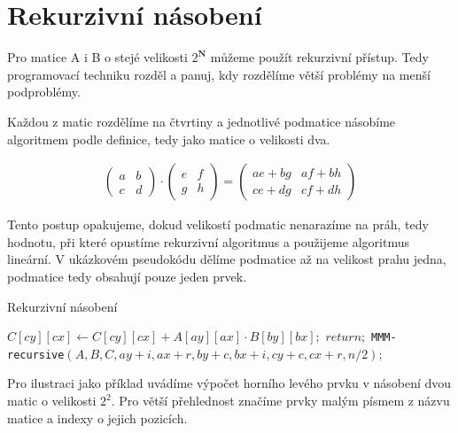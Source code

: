 \documentclass[thesis=B,czech]{FITthesis}[2012/06/26]
\begin{document}

\section{Rekurzivní násobení}

Pro matice A i B o stejé velikosti $ {2^\mathbf{N}} $ můžeme použít rekurzivní přístup. Tedy programovací techniku rozděl a panuj, kdy rozdělíme větší problémy na menší podproblémy.

Každou z matic rozdělíme na čtvrtiny a jednotlivé podmatice násobíme algoritmem podle definice, tedy jako matice o velikosti dva.

\label{2x2MMM}
\begin{align}
\begin{pmatrix}
 a & b \\
 c & d
\end{pmatrix} \cdot \begin{pmatrix}
 e & f \\
 g & h
\end{pmatrix} = \begin{pmatrix}
 ae+bg & af+bh \\
 ce+dg & cf+dh
\end{pmatrix}
\end{align}

Tento postup opakujeme, dokud velikostí podmatic nenarazíme na práh, tedy hodnotu, při které opustíme rekurzivní algoritmus a použijeme algoritmus lineární. V ukázkovém pseudokódu dělíme podmatice až na velikost prahu jedna, podmatice tedy obsahují pouze jeden prvek.

\begin{algorithm}[H]
	\caption{Rekurzivní násobení}\label{mmm-recursive}
	\begin{algorithmic}[1]
			\State \texttt{$C[cy][cx]\gets C[cy][cx] + A[ay][ax] \cdot B[by][bx];$}
			\State \texttt{$return;$}
		\EndIf
					\State \texttt{MMM-recursive$(A,B,C,ay+i,ax+r,by+c,bx+i,cy+c,cx+r,n/2);$}
				\EndFor
			\EndFor
		\EndFor
		\EndProcedure
	\end{algorithmic}
\end{algorithm}

Pro ilustraci jako příklad uvádíme výpočet horního levého prvku v násobení dvou matic o velikosti $ 2^{2} $. Pro větší přehlednost značíme prvky malým písmem z názvu matice a indexy o jejich pozicích.
\end{document}
